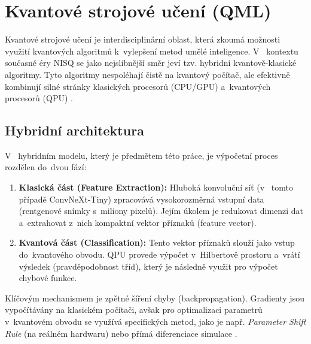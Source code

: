 \documentclass[12pt, a4paper]{report}
\begin{document}
\section{Kvantové strojové učení (QML)} \label{sec:qml}

Kvantové strojové učení je interdisciplinární oblast, která zkoumá možnosti využití kvantových algoritmů k~vylepšení metod umělé inteligence.
V ~kontextu současné éry NISQ se jako nejslibnější směr jeví tzv. hybridní kvantově-klasické algoritmy.
Tyto algoritmy nespoléhají čistě na kvantový počítač, ale efektivně kombinují silné stránky klasických procesorů (CPU/GPU) a~kvantových procesorů (QPU) \cite{schuld_book}.

\subsection{Hybridní architektura}
V ~hybridním modelu, který je předmětem této práce, je výpočetní proces rozdělen do~dvou fází:
\begin{enumerate}
    \item \textbf{Klasická část (Feature Extraction):} Hluboká konvoluční síť (v ~tomto případě ConvNeXt-Tiny) zpracovává vysokorozměrná vstupní data (rentgenové snímky s~miliony pixelů).
    Jejím úkolem je redukovat dimenzi dat a~extrahovat z~nich kompaktní vektor příznaků (feature vector).
    \item \textbf{Kvantová část (Classification):} Tento vektor příznaků slouží jako vstup do~kvantového obvodu.
    QPU provede výpočet v~Hilbertově prostoru a~vrátí výsledek (pravděpodobnost tříd), který je následně využit pro výpočet chybové funkce.
\end{enumerate}

Klíčovým mechanismem je zpětné šíření chyby (backpropagation). Gradienty jsou vypočítávány na klasickém počítači, avšak pro optimalizaci parametrů v~kvantovém obvodu se využívá specifických metod, jako je např.
\textit{Parameter Shift Rule} (na reálném hardwaru) nebo přímá diferenciace simulace \cite{mitarai_qcl}.
\end{document}
